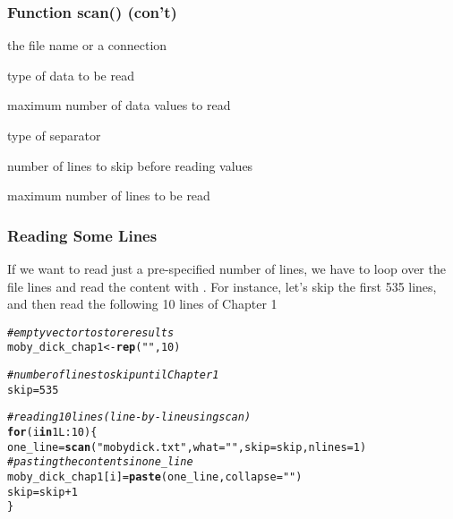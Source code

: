 \documentclass[12pt]{beamer}\usepackage[]{graphicx}\usepackage[]{color}
\makeatletter
\newcommand{\hlnum}[1]{\textcolor[rgb]{0.686,0.059,0.569}{#1}}%
\newcommand{\hlstr}[1]{\textcolor[rgb]{0.192,0.494,0.8}{#1}}%
\newcommand{\hlcom}[1]{\textcolor[rgb]{0.678,0.584,0.686}{\textit{#1}}}%
\newcommand{\hlopt}[1]{\textcolor[rgb]{0,0,0}{#1}}%
\newcommand{\hlstd}[1]{\textcolor[rgb]{0.345,0.345,0.345}{#1}}%
\newcommand{\hlkwa}[1]{\textcolor[rgb]{0.161,0.373,0.58}{\textbf{#1}}}%
\newcommand{\hlkwb}[1]{\textcolor[rgb]{0.69,0.353,0.396}{#1}}%
\newcommand{\hlkwc}[1]{\textcolor[rgb]{0.333,0.667,0.333}{#1}}%
\newcommand{\hlkwd}[1]{\textcolor[rgb]{0.737,0.353,0.396}{\textbf{#1}}}%
\newenvironment{kframe}{%
 \def\at@end@of@kframe{}%
 \ifinner\ifhmode%
  \def\at@end@of@kframe{\end{minipage}}%
  \begin{minipage}{\columnwidth}%
 \fi\fi%
 \def\FrameCommand##1{\hskip\@totalleftmargin \hskip-\fboxsep
 \colorbox{shadecolor}{##1}\hskip-\fboxsep
     \hskip-\linewidth \hskip-\@totalleftmargin \hskip\columnwidth}%
 \MakeFramed {\advance\hsize-\width
   \@totalleftmargin\z@ \linewidth\hsize
   \@setminipage}}%
 {\par\unskip\endMakeFramed%
 \at@end@of@kframe}
\newenvironment{knitrout}{}{} %
\makeatother
\begin{document}
\begin{frame}[fragile]
\frametitle{Function scan() (con't)}

\bi
 \item {} the file name or a connection
 \item {} type of data to be read
 \item {} maximum number of data values to read
 \item {} type of separator
 \item {} number of lines to skip before reading values
 \item {} maximum number of lines to be read
\ei
\eb

\end{frame}


\begin{frame}[fragile]
\frametitle{Reading Some Lines}

If we want to read just a pre-specified number of lines, we have to loop over the file lines and read the content with {\hilit {}}. For instance, let's skip the first 535 lines, and then read the following 10 lines of Chapter 1

\begin{knitrout}\scriptsize
{}\color{fgcolor}\begin{kframe}
\begin{alltt}
\hlcom{# empty vector to store results}
\hlstd{moby_dick_chap1} \hlkwb{<-} \hlkwd{rep}\hlstd{(}\hlstr{""}\hlstd{,} \hlnum{10}\hlstd{)}

\hlcom{# number of lines to skip until Chapter 1}
\hlstd{skip} \hlkwb{=} \hlnum{535}

\hlcom{# reading 10 lines (line-by-line using scan)}
\hlkwa{for} \hlstd{(i} \hlkwa{in} \hlnum{1L}\hlopt{:}\hlnum{10}\hlstd{) \{}
  \hlstd{one_line} \hlkwb{=} \hlkwd{scan}\hlstd{(}\hlstr{"mobydick.txt"}\hlstd{,} \hlkwc{what} \hlstd{=} \hlstr{""}\hlstd{,} \hlkwc{skip} \hlstd{= skip,} \hlkwc{nlines} \hlstd{=} \hlnum{1}\hlstd{)}
  \hlcom{# pasting the contents in one_line}
  \hlstd{moby_dick_chap1[i]} \hlkwb{=} \hlkwd{paste}\hlstd{(one_line,} \hlkwc{collapse} \hlstd{=} \hlstr{" "}\hlstd{)}
  \hlstd{skip} \hlkwb{=} \hlstd{skip} \hlopt{+} \hlnum{1}
\hlstd{\}}
\end{alltt}
\end{kframe}
\end{knitrout}

\end{frame}
\end{document}
